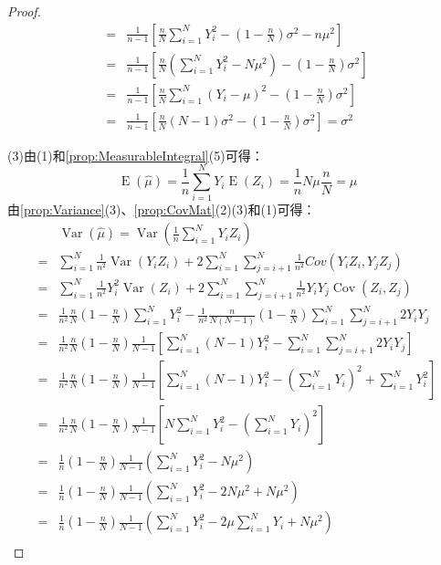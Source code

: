 \begin{proof}
\begin{align*}
		=&\frac{1}{n-1}\left[\frac{n}{N}\sum_{i=1}^{N}Y_i^2-\left(1-\frac{n}{N}\right)\sigma^2-n\mu^2\right] \\
		=&\frac{1}{n-1}\left[\frac{n}{N}\left(\sum_{i=1}^{N}Y_i^2-N\mu^2\right)-\left(1-\frac{n}{N}\right)\sigma^2\right] \\
		=&\frac{1}{n-1}\left[\frac{n}{N}\sum_{i=1}^{N}(Y_i-\mu)^2-\left(1-\frac{n}{N}\right)\sigma^2\right] \\
		=&\frac{1}{n-1}\left[\frac{n}{N}(N-1)\sigma^2-\left(1-\frac{n}{N}\right)\sigma^2\right]=\sigma^2
	\end{align*}\par
	(3)由(1)和\cref{prop:MeasurableIntegral}(5)可得：
	\begin{equation*}
		\operatorname{E}(\hat{\mu})=\frac{1}{n}\sum_{i=1}^{N}Y_i\operatorname{E}(Z_i)=\frac{1}{n}N\mu\frac{n}{N}=\mu
	\end{equation*}
	由\cref{prop:Variance}(3)、\cref{prop:CovMat}(2)(3)和(1)可得：
	\begin{align*}
		&\operatorname{Var}(\hat{\mu})
		=\operatorname{Var}\left(\frac{1}{n}\sum_{i=1}^NY_iZ_i\right) \\
		=&\sum_{i=1}^N\frac{1}{n^2}\operatorname{Var}(Y_iZ_i)+2\sum_{i=1}^N\sum_{j=i+1}^N\frac{1}{n^2}Cov(Y_iZ_i,Y_jZ_j) \\
		=&\sum_{i=1}^N\frac{1}{n^2}Y_i^2\operatorname{Var}(Z_i)+2\sum_{i=1}^N\sum_{j=i+1}^N\frac{1}{n^2}Y_iY_j\operatorname{Cov}(Z_i,Z_j) \\
		=&\frac{1}{n^2}\frac{n}{N}\left(1-\frac{n}{N}\right)\sum_{i=1}^{N}Y_i^2-\frac{1}{n^2}\frac{n}{N(N-1)}\left(1-\frac{n}{N}\right)\sum_{i=1}^{N}\sum_{j=i+1}^{N}2Y_iY_j \\
		=&\frac{1}{n^2}\frac{n}{N}\left(1-\frac{n}{N}\right)\frac{1}{N-1}\left[\sum_{i=1}^{N}(N-1)Y_i^2-\sum_{i=1}^{N}\sum\limits_{j=i+1}^N2Y_iY_j\right] \\
		=&\frac{1}{n^2}\frac{n}{N}\left(1-\frac{n}{N}\right)\frac{1}{N-1}\left[\sum_{i=1}^{N}(N-1)Y_i^2-\left(\sum_{i=1}^NY_i\right)^2+\sum_{i=1}^NY_i^2\right] \\
		=&\frac{1}{n^2}\frac{n}{N}\left(1-\frac{n}{N}\right)\frac{1}{N-1}\left[N\sum_{i=1}^{N}Y_i^2-\left(\sum_{i=1}^NY_i\right)^2\right] \\
		=&\frac{1}{n}\left(1-\frac{n}{N}\right)\frac{1}{N-1}\left(\sum\limits_{i=1}^{N}Y_i^2-N\mu^2\right) \\
		=&\frac{1}{n}\left(1-\frac{n}{N}\right)\frac{1}{N-1}\left(\sum\limits_{i=1}^{N}Y_i^2-2N\mu^2+N\mu^2\right) \\
		=&\frac{1}{n}\left(1-\frac{n}{N}\right)\frac{1}{N-1}\left(\sum\limits_{i=1}^{N}Y_i^2-2\mu\sum\limits_{i=1}^NY_i+N\mu^2\right) \\     

\end{align*}
\end{proof}
